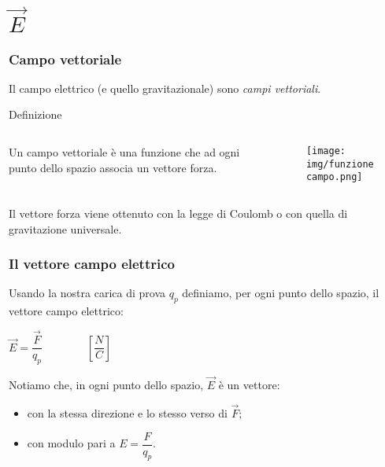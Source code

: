 \documentclass[]{beamer}
\theoremstyle{plain}
\begin{document}
\section{$ \vec{E} $}

\begin{frame}
\frametitle{Campo vettoriale}
Il campo elettrico (e quello gravitazionale) sono \emph{campi vettoriali}.

\begin{block}{Definizione}
\begin{columns}
\begin{column}{0.4\textwidth}
Un campo vettoriale è una funzione che ad ogni punto dello spazio associa un vettore forza.
\end{column}
\begin{column}{0.4\textwidth}
\begin{figure}
\texttt{[image: img/funzionecampo.png]}
\end{figure}
\end{column}
\end{columns}
\end{block}

Il vettore forza viene ottenuto con la legge di Coulomb o con quella di gravitazione universale.
\end{frame}


\begin{frame}
\frametitle{Il vettore campo elettrico}
\begin{figure}
\end{figure}
Usando la nostra carica di prova $ q_p $ definiamo, per ogni punto dello spazio, il \alert{vettore campo elettrico}:

\begin{center}
\colorbox{marroncino!30}{$ \vec{E} = \dfrac{\vec{F}}{q_p} $}~~~~~~~~$ \left[\dfrac{N}{C}\right] $
\end{center}\pause
Notiamo che, in ogni punto dello spazio, \alert{$ \vec{E} $ è un vettore}:
\begin{itemize}
  \item con la stessa direzione e lo stesso verso di $ \vec{F} $;\pause
  \item con modulo pari a $ E = \dfrac{F}{q_p} $.
\end{itemize}
\end{frame}
\end{document}
